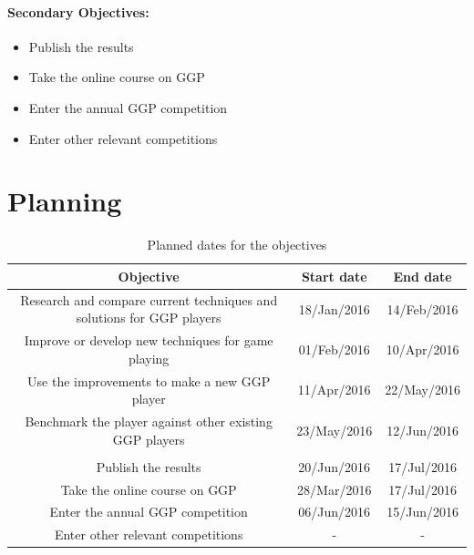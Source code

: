 \paragraph{Secondary Objectives:}
\begin{itemize}
\item Publish the results
\item Take the online course on GGP
\item Enter the annual GGP competition
\item Enter other relevant competitions
\end{itemize}




\section{Planning}


\begin{table}[h]
\caption{Planned dates for the objectives}
\label{table:Planning}
\small
\begin{tabular}{| c | c | c |}
\hline Objective & Start date & End date \\

\hline Research and compare current techniques and solutions for GGP players & 18/Jan/2016 & 14/Feb/2016 \\
\hline Improve or develop new techniques for game playing & 01/Feb/2016 & 10/Apr/2016 \\
\hline Use the improvements to make a new GGP player & 11/Apr/2016 & 22/May/2016 \\
\hline Benchmark the player against other existing GGP players & 23/May/2016 & 12/Jun/2016 \\

\hline \\

\hline Publish the results & 20/Jun/2016 & 17/Jul/2016 \\
\hline Take the online course on GGP & 28/Mar/2016 & 17/Jul/2016 \\
\hline Enter the annual GGP competition & 06/Jun/2016 & 15/Jun/2016 \\
\hline Enter other relevant competitions & - & - \\

\hline
\end{tabular}
\end{table}


